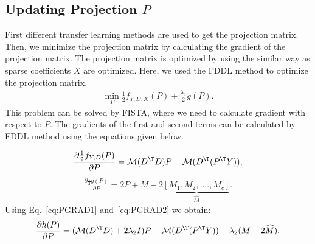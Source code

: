 \subsection*{Updating Projection $P$}
First different transfer learning methods are used to get the projection matrix. Then, we minimize the projection matrix by calculating the gradient of the projection matrix. The projection matrix is optimized by using the similar way as sparse coefficients $X$ are optimized. Here, we used the FDDL method to optimize the projection matrix. 
\begin{equation}
\begin{aligned}
\min_P \frac{1}{2}f_{Y,D,X}(P) + \frac{\lambda_2}{2}g(P).
\end{aligned}
\label{eq:DLPL}
\end{equation}
This problem can be solved by FISTA, where we need to calculate gradient with respect to $P$. The gradients of the first and second terms can be calculated by FDDL method using the equations given below.   

\begin{equation}
\begin{aligned}
\frac{\partial \frac{1}{2}f_{Y,D}(P)}{\partial P} = \mathcal{M}(D^\T D)P - \mathcal{M}(D^\T (P^\T Y)),
\end{aligned}
\label{eq:PGRAD1}
\end{equation}
\begin{equation}
\begin{aligned}
\frac{\partial \frac{1}{2}g(P)}{\partial P} = 2P + M -2\underbrace{[M_1, M_2 ,.... , M_c]}_{\widehat{M}}.
\end{aligned}
\label{eq:PGRAD2}
\end{equation}
Using Eq.~\eqref{eq:PGRAD1} and~\eqref{eq:PGRAD2} we obtain:
\begin{equation}
\begin{aligned}
\frac{\partial h(P)}{\partial P} = (\mathcal{M} (D^\T D) + 2 \lambda_2 I)P - \mathcal{M}(D^\T (P^\T Y))+\lambda_2(M-2 \widehat{M}).
\end{aligned}
\label{eq:GRAD245}
\end{equation}








